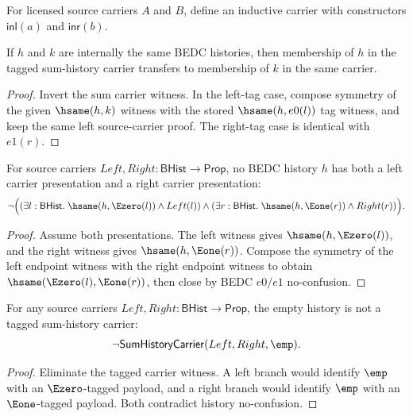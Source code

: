 \begin{definition}
\label{def:sum-carrier}
For licensed source carriers \(A\) and \(B\), define an inductive carrier with constructors \(\mathsf{inl}(a)\) and \(\mathsf{inr}(b)\).
\end{definition}

\begin{theorem}
\label{thm:sum-history-carrier-hsame-transport}
If $h$ and $k$ are internally the same BEDC histories, then membership of $h$ in the tagged sum-history carrier transfers to membership of $k$ in the same carrier.
\end{theorem}
\begin{proof}
Invert the sum carrier witness. In the left-tag case, compose symmetry of the given $\hsame(h,k)$ witness with the stored $\hsame(h,e0(l))$ tag witness, and keep the same left source-carrier proof. The right-tag case is identical with $e1(r)$.
\end{proof}

\begin{theorem}
\label{thm:sum-history-carrier-branch-exclusivity}
For source carriers $Left,Right:\mathsf{BHist}\to\mathsf{Prop}$, no BEDC history $h$ has both a left carrier presentation and a right carrier presentation:
$$
\neg\Bigl(
(\exists l:\mathsf{BHist}.\; \hsame(h,\Ezero(l))\land Left(l))
\land
(\exists r:\mathsf{BHist}.\; \hsame(h,\Eone(r))\land Right(r))
\Bigr).
$$
\end{theorem}
\begin{proof}
Assume both presentations. The left witness gives $\hsame(h,\Ezero(l))$, and the right witness gives $\hsame(h,\Eone(r))$. Compose the symmetry of the left endpoint witness with the right endpoint witness to obtain $\hsame(\Ezero(l),\Eone(r))$, then close by BEDC $e0/e1$ no-confusion.
\end{proof}

\begin{theorem}
\label{thm:sum-history-carrier-empty-absurd}
For any source carriers \(Left,Right:\mathsf{BHist}\to\mathsf{Prop}\), the
empty history is not a tagged sum-history carrier:
$$
\neg\mathsf{SumHistoryCarrier}(Left,Right,\emp).
$$
\end{theorem}
\begin{proof}
Eliminate the tagged carrier witness. A left branch would identify \(\emp\)
with an \(\Ezero\)-tagged payload, and a right branch would identify \(\emp\)
with an \(\Eone\)-tagged payload. Both contradict history no-confusion.
\end{proof}

